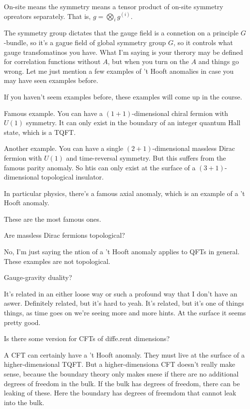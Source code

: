 On-site means the symmetry means a tensor product of on-site symmetry opreators
separately.
That is, 
$g=\bigotimes_i g^{(i)}$.

The symmetry group dictates that the gauge field is a connetion on a principle
$G$-bundle,
so it's a gague field of global symmetry group $G$,
so it controls what gauge transfomatinos you have.
What I'm saying is
your therory may be defined for correlation functions without $A$,
but when you turn on the $A$ and things go wrong.
Let me just mention a few examples of 't Hooft anomalies in case you may have
seen examples before.

If you haven't seem examples before,
these examples will come up in the course.

Famous example.
You can have a $(1+1)$-dimensional chiral fermion
with $U(1)$ symmetry.
It can only exist in the boundary of an integer quantum Hall state,
which is a TQFT.

Another example.
You can have a single $(2+1)$-dimensional massless Dirac fermion
with $U(1)$ and time-reversal symmetry.
But this suffers from the famous parity anomaly.
So htis can only exist at the surface of a $(3+1)$-dimensional topological
insulator.

In particular physics,
there's a famous axial anomaly,
which is an example of a 't Hooft anomaly.

These are the most famous ones.

\begin{question}
    Are massless Dirac fermions topological?
\end{question}
No,
I'm just saying the ntion of a 't Hooft anomaly applies to QFTs in general.
These examples are not topological.

\begin{question}
    Gauge-gravity duality?
\end{question}
It's related in an either loose way or such a profound way that I don't have an
aswer.
Definitely related,
but it's hard to yeah.
It's related,
but it's one of things things,
as time goes on
we're seeing more and more hints.
At the surface it seems pretty good.

\begin{question} 
    Is there some version for CFTs of diffe.rent dimensions?
\end{question}
A CFT can certainly have a 't Hooft anomaly.
They must live at the surface of a higher-dimensional TQFT.
But a higher-dimensiona CFT doesn't really make sense,
because the boundary theory only makes snese
if there are no additional degrees of freedom in the bulk.
If the bulk has degrees of freedom,
there can be leaking of these.
Here the boundary has degrees of freemdom that cannot leak into the bulk.

